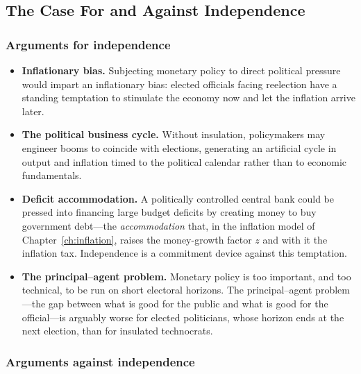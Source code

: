 
\subsection{The Case For and Against Independence}

\subsubsection*{Arguments for independence}

\begin{itemize}
    \item \textbf{Inflationary bias.} Subjecting monetary policy to direct political pressure would impart an inflationary bias: elected officials facing reelection have a standing temptation to stimulate the economy now and let the inflation arrive later.
    \item \textbf{The political business cycle.} Without insulation, policymakers may engineer booms to coincide with elections, generating an artificial cycle in output and inflation timed to the political calendar rather than to economic fundamentals.
    \item \textbf{Deficit accommodation.} A politically controlled central bank could be pressed into financing large budget deficits by creating money to buy government debt---the \emph{accommodation} that, in the inflation model of Chapter~\ref{ch:inflation}, raises the money-growth factor $z$ and with it the inflation tax. Independence is a commitment device against this temptation.
    \item \textbf{The principal--agent problem.} Monetary policy is too important, and too technical, to be run on short electoral horizons. The principal--agent problem---the gap between what is good for the public and what is good for the official---is arguably worse for elected politicians, whose horizon ends at the next election, than for insulated technocrats.
\end{itemize}

\subsubsection*{Arguments against independence}

